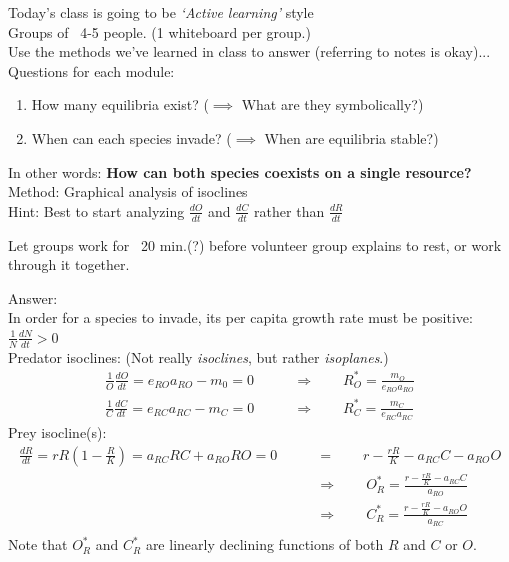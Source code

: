 \documentclass{article}
\newcommand{\note}[1]{\colorbox{gray!30}{#1}}
\newcommand{\ind}{\-\hspace{1cm}}
\begin{document}
Today's class is going to be \emph{`Active learning'} style\\
\ind \note{Groups of ~4-5 people.  (1 whiteboard per group.)}\\

Use the methods we've learned in class to answer (\note{referring to notes is okay})...\\
Questions for each module:
\begin{enumerate}
	\item How many equilibria exist? ($\implies$ What are they symbolically?)
	\item When can each species invade? ($\implies$ When are equilibria stable?)
\end{enumerate}

In other words: \textbf{How can both species coexists on a single resource?}\\

Method: Graphical analysis of isoclines\\

Hint:  Best to start analyzing $\frac{dO}{dt}$ and $\frac{dC}{dt}$ rather than $\frac{dR}{dt}$\\

\dotfill

\note{Let groups work for ~20 min.(?) before volunteer group explains to rest, or work through it together.}

\dotfill

\pagebreak

\note{Answer:}\\
In order for a species to invade, its per capita growth rate must be positive:  $\frac{1}{N}\frac{dN}{dt}>0$\\

Predator isoclines: (Not really \emph{isoclines}, but rather \emph{isoplanes}.)
\begin{align*}
	\frac{1}{O}\frac{dO}{dt} = e_{RO}a_{RO}-m_0 = 0 & \qquad \Rightarrow  \qquad R_O^* = \frac{m_O}{e_{RO}a_{RO}}\\
	\frac{1}{C}\frac{dC}{dt} = e_{RC}a_{RC}-m_C = 0 & \qquad \Rightarrow  \qquad R_C^* = \frac{m_C}{e_{RC}a_{RC}}
\end{align*}
Prey isocline(s):
\begin{align*}
	\frac{dR}{dt}=rR\left(1-\frac{R}{K}\right) = a_{RC}RC + a_{RO}RO = 0  & \qquad =  \qquad r-\frac{rR}{K}-a_{RC}C - a_{RO}O\\
	& \qquad \Rightarrow  \qquad O_R^* = \frac{r-\tfrac{rR}{K}-a_{RC}C}{a_{RO}}\\
	& \qquad \Rightarrow  \qquad C_R^* = \frac{r-\tfrac{rR}{K}-a_{RO}O}{a_{RC}}\\
\end{align*}
Note that $O_R^*$ and $C_R^*$ are linearly declining functions of both $R$ and $C$ or $O$.
\end{document}
